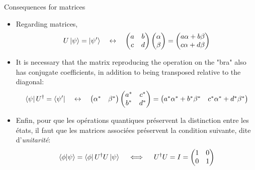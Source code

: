 \documentclass[aspectratio=169,12pt]{beamer}
\begin{document}
\begin{frame}{Consequences for matrices}
    \begin{itemize}   
        \item Regarding matrices,
        \begin{equation*}
            U \ket{\psi} = \ket{\psi'} \quad\leftrightarrow\quad 
            \begin{pmatrix}
                a & b \\
                c & d
            \end{pmatrix}
            \begin{pmatrix}
                \alpha \\
                \beta
            \end{pmatrix}
             =
            \begin{pmatrix}
                a\alpha + b\beta \\
                c\alpha + d\beta
            \end{pmatrix}
        \end{equation*}

        \item It is necessary that the matrix reproducing the operation on the "bra" also has conjugate coefficients, in addition to being transposed relative to the diagonal:
        \begin{equation*}
            \bra{\psi} U^\dagger = \bra{\psi'} \quad\leftrightarrow\quad 
            \begin{pmatrix}
                \alpha^* & \beta^*
            \end{pmatrix}
            \begin{pmatrix}
                a^* & c^* \\
                b^* & d^*
            \end{pmatrix}
            =
            \begin{pmatrix}
                a^*\alpha^* + b^*\beta^* & c^*\alpha^* + d^*\beta^*
            \end{pmatrix}
        \end{equation*}

        \item Enfin, pour que les opérations quantiques préservent la distinction entre les états, il faut que les matrices associées préservent la condition suivante, dite d'\textit{unitarité}: 
        \begin{equation*}
            \braket{\phi}{\psi} = \bra{\phi} U^\dagger U \ket{\psi} \quad\iff\quad U^\dagger U = I
            =
            \begin{pmatrix}
                1 & 0 \\
                0 & 1
            \end{pmatrix}
        \end{equation*}
    \end{itemize}
\end{frame}
\end{document}
